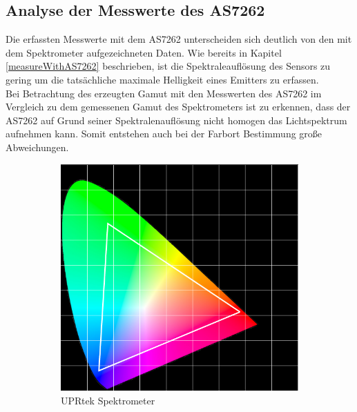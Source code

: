 \documentclass[11pt]{scrartcl}
\begin{document}
\subsection{Analyse der Messwerte des AS7262}
Die erfassten Messwerte mit dem AS7262 unterscheiden sich deutlich von den mit dem Spektrometer aufgezeichneten Daten. Wie bereits in Kapitel \ref{measureWithAS7262}
beschrieben, ist die Spektraleauflösung des Sensors zu gering um die tatsächliche maximale Helligkeit eines Emitters zu erfassen.\\
Bei Betrachtung des erzeugten Gamut mit den Messwerten des AS7262 im Vergleich zu dem gemessenen Gamut des Spektrometers ist zu erkennen, dass der AS7262 auf Grund
seiner Spektralenauflösung nicht homogen das Lichtspektrum aufnehmen kann. Somit entstehen auch bei der Farbort Bestimmung große Abweichungen.
\begin{figure}[H]
    \centering
    \begin{subfigure}[b]{.49\textwidth}
        \includegraphics[width=\textwidth]{images/app_skypanel_gamut_uprtek.png}
        \caption{UPRtek Spektrometer}
    \end{subfigure}
    \hfill 
    \begin{subfigure}[b]{.49\textwidth}

\end{subfigure}
\end{figure}
\end{document}
